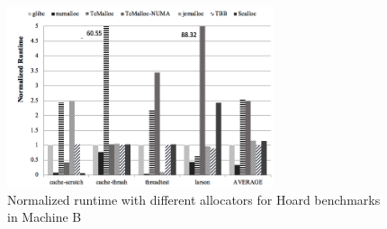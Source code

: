 \begin{figure}[H]
    \centering
    \includegraphics[width=\textwidth,height=200]{figure/8-node-hoard-perf.png}
    \caption{Normalized runtime with different allocators for Hoard benchmarks in Machine B}
    \label{8node-hoard-perf}
\end{figure}


